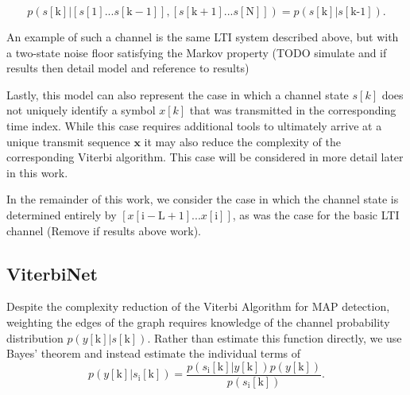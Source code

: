 \documentclass[12pt,a4paper]{report}
\begin{document}
\begin{equation*}
p(s[\text{k}]|\left[s[\mathrm{1}]...s[\mathrm{k-1}]\right],\left[s[\mathrm{k+1}]...s[\mathrm{N}]\right]) = p(s[\text{k}]|s[\text{k-1}]).
\end{equation*}

An example of such a channel is the same LTI system described above, but with a two-state noise floor satisfying the Markov property (TODO simulate and if results then detail model and reference to results)
\par
Lastly, this model can also represent the case in which a channel state $s[k]$ does not uniquely identify a symbol $x[k]$ that was transmitted in the corresponding time index. While this case requires additional tools to ultimately arrive at a unique transmit sequence $\mathbf{x}$ it may also reduce the complexity of the corresponding Viterbi algorithm. This case will be considered in more detail later in this work.
\par
In the remainder of this work, we consider the case in which the  channel state is determined entirely by $\left[x[\mathrm{i-L+1}]...x[\mathrm{i}]\right]$, as was the case for the basic LTI channel (Remove if results above work). 

\subsection{ViterbiNet}

Despite the complexity reduction of the Viterbi Algorithm for MAP detection, weighting the edges of the graph requires knowledge of the channel probability distribution $p(y[\mathrm{k}]|s[\mathrm{k}])$. Rather than estimate this function directly, we use Bayes' theorem and instead estimate the individual terms of
\begin{equation*}
p(y[\mathrm{k}]|s_{\text{i}}[\text{k}]) = 
\frac
{p(s_{\text{i}}[\text{k}]|y[\mathrm{k}])p(y[\mathrm{k}])}
{p(s_{\text{i}}[\text{k}])}.
\end{equation*}
\end{document}
